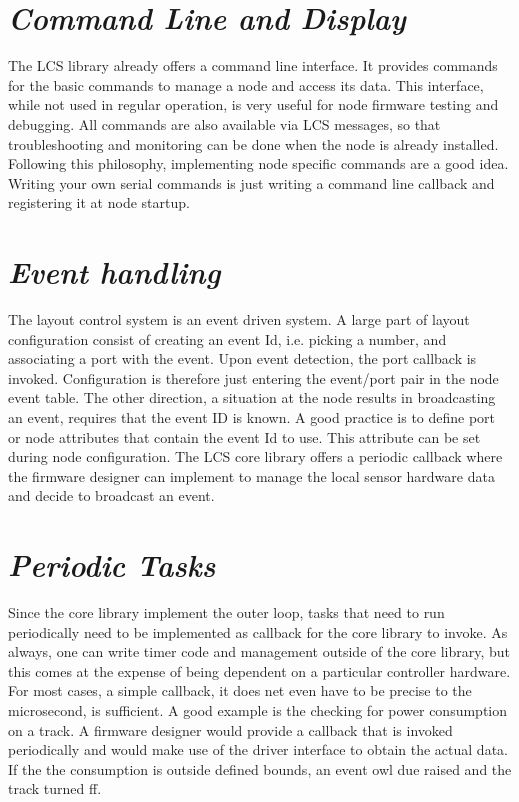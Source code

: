 \section{\textit{Command Line and Display}}

The LCS library already offers a command line interface. It provides commands for the basic commands to manage a node and access its data. This interface, while not used in regular operation, is very useful for node firmware testing and debugging. All commands are also available via LCS messages, so that troubleshooting and monitoring can be done when the node is already installed. Following this philosophy, implementing node specific commands are a good idea. Writing your own serial commands is just writing a command line callback and registering it at node startup.

\section{\textit{Event handling}}

The layout control system is an event driven system. A large part of layout configuration consist of creating an event Id, i.e. picking a number, and associating a port with the event. Upon event detection, the port callback is invoked. Configuration is therefore just entering the event/port pair in the node event table. The other direction, a situation at the node results in broadcasting an event, requires that the event ID is known. A good practice is to define port or node attributes that contain the event Id to use. This attribute can be set during node configuration. The LCS core library offers a periodic callback where the firmware designer can implement to manage the local sensor hardware data and decide to broadcast an event.

\section{\textit{Periodic Tasks}}

Since the core library implement the outer loop, tasks that need to run periodically need to be implemented as callback for the core library to invoke. As always, one can write timer code and management outside of the core library, but this comes at the expense of being dependent on a particular controller hardware. For most cases, a simple callback, it does net even have to be precise to the microsecond, is sufficient. A good example is the checking for power consumption on a track. A firmware designer would provide a callback that is invoked periodically and would make use of the driver interface to obtain the actual data. If the the consumption is outside defined bounds, an event owl  due raised and the track turned ff. 

